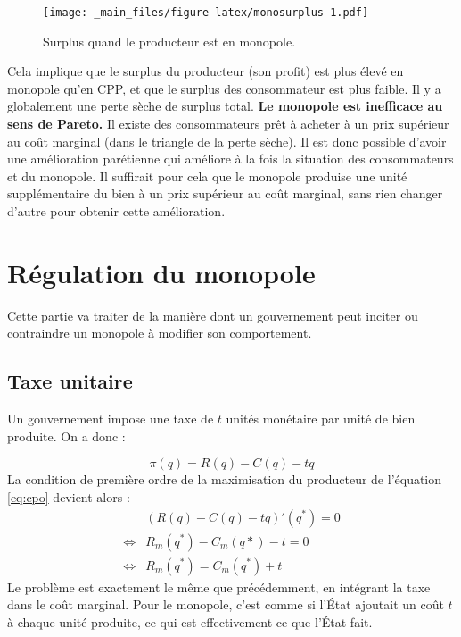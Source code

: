 \documentclass[
]{book}
\theoremstyle{definition}
\theoremstyle{definition}
\theoremstyle{definition}
\theoremstyle{definition}
\theoremstyle{remark}
\begin{document}
\begin{figure}
\centering
\texttt{[image: \_main\_files/figure-latex/monosurplus-1.pdf]}
\caption{\label{fig:monosurplus}Surplus quand le producteur est en monopole.}
\end{figure}

Cela implique que le surplus du producteur (son profit) est plus élevé en monopole qu'en CPP, et que le surplus des consommateur est plus faible.
Il y a globalement une perte sèche de surplus total.
\textbf{Le monopole est inefficace au sens de Pareto.}
Il existe des consommateurs prêt à acheter à un prix supérieur au coût marginal (dans le triangle de la perte sèche).
Il est donc possible d'avoir une amélioration parétienne qui améliore à la fois la situation des consommateurs et du monopole.
Il suffirait pour cela que le monopole produise une unité supplémentaire du bien à un prix supérieur au coût marginal, sans rien changer d'autre pour obtenir cette amélioration.

\hypertarget{ruxe9gulation-du-monopole}{%
\section{Régulation du monopole}\label{ruxe9gulation-du-monopole}}

Cette partie va traiter de la manière dont un gouvernement peut inciter ou contraindre un monopole à modifier son comportement.

\hypertarget{taxe-unitaire}{%
\subsection{Taxe unitaire}\label{taxe-unitaire}}

Un gouvernement impose une taxe de \(t\) unités monétaire par unité de bien produite.
On a donc :

\[
\pi(q) = R(q) - C(q) -tq
\]
La condition de première ordre de la maximisation du producteur de l'équation \eqref{eq:cpo} devient alors :
\[
\begin{array}{rl}
&(R(q)-C(q) -tq)'(q^*) = 0\\
\Leftrightarrow & R_m(q^*)-C_m(q*) -t = 0\\
\Leftrightarrow & R_m(q^*) = C_m(q^*) + t
\end{array}
\]
Le problème est exactement le même que précédemment, en intégrant la taxe dans le coût marginal.
Pour le monopole, c'est comme si l'État ajoutait un coût \(t\) à chaque unité produite, ce qui est effectivement ce que l'État fait.
\end{document}

